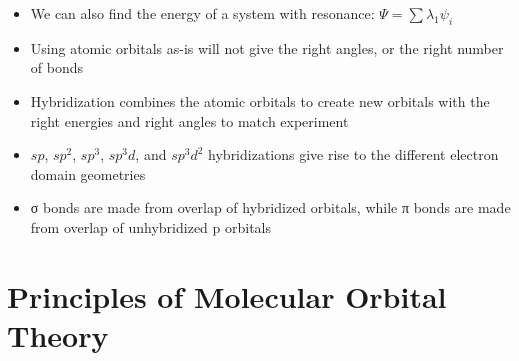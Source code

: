 \documentclass[12pt, openany, letterpaper]{memoir}
\begin{document}
\begin{itemize}
	\item We can also find the energy of a system with resonance: $\Psi = \displaystyle\sum\lambda_1\psi_i$
	\item Using atomic orbitals as-is will not give the right angles, or the right number of bonds
	\item Hybridization combines the atomic orbitals to create new orbitals with the right energies and right angles to match experiment
	\item $sp$, $sp^2$, $sp^3$, $sp^3d$, and $sp^3d^2$ hybridizations give rise to the different electron domain geometries
	\item σ bonds are made from overlap of hybridized orbitals, while π bonds are made from overlap of unhybridized p orbitals
\end{itemize}
\section{Principles of Molecular Orbital Theory}
\end{document}
